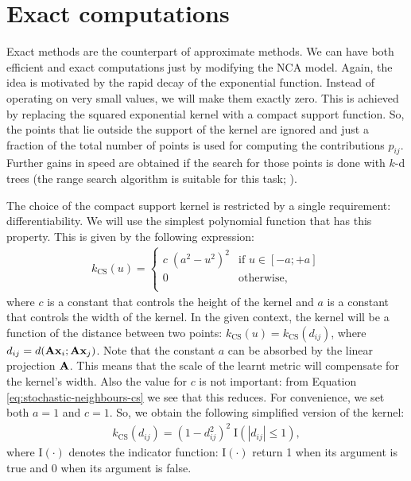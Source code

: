 	
	
\section{Exact computations}
\label{sec:exact-computations}

	Exact methods are the counterpart of approximate methods. We can have both efficient and exact computations just by modifying the NCA model. Again, the idea is motivated by the rapid decay of the
	exponential function. Instead of operating on very small values, we will make them exactly zero. This is achieved by replacing the squared exponential kernel with a compact support function. So, the points that lie outside the support of the kernel are ignored and just a fraction of the total number of points is used for computing the contributions $p_{ij}$. Further gains in speed are obtained if the search for those points is done with $k$-d trees (the range search algorithm is suitable for this task; \citealp{moore1991}).
	
	The choice of the compact support kernel is restricted by a single requirement: differentiability. We will use the simplest polynomial function that has this property. This is given by the
	following expression:
	\begin{align}
		k_{\text{CS}}(u)=\begin{cases}
			c\;(a^2-u^2)^2& \mbox{if } u \in [-a;+a]\\
			0& \mbox{otherwise},\\
		\end{cases}
		\label{eq:cs-1}
	\end{align}
	where $c$ is a constant that controls the height of the kernel and $a$ is a constant that controls the width of the kernel. In the given context, the kernel will be a function of the distance between two points: $k_{\text{CS}}(u)=k_{\text{CS}}(d_{ij})$, where $d_{ij} = d(\mathbf{A}\mathbf{x}_i;\mathbf{A}\mathbf{x}_j)$. Note that the constant $a$ can be absorbed by the linear projection $\mathbf{A}$. This means that the scale of the learnt metric will compensate for the kernel's width. Also the value for $c$ is not important: from Equation \ref{eq:stochastic-neighbours-cs} we see that this reduces. For convenience, we set both $a=1$ and $c=1$. So, we obtain the following simplified version of the kernel:
	\begin{align}
		k_{\text{CS}}(d_{ij})= (1-d_{ij}^2)^2\;\mathrm{I}(\left|d_{ij}\right|\le1),
	\end{align}
	where $\mathrm{I}(\cdot)$ denotes the indicator function: $\mathrm{I}(\cdot)$ return 1 when its argument is
	true and 0 when its argument is false.
	
